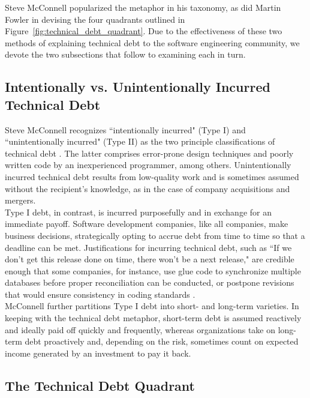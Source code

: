 Steve McConnell \cite{mcconnell} popularized the metaphor in his taxonomy, as did Martin Fowler \cite{fowler} in devising the four quadrants outlined in Figure~\ref{fig:technical_debt_quadrant}.  \revision Due to the effectiveness of these two methods of explaining technical debt to the software engineering community, we devote the two subsections that follow to examining each in turn.


\subsection{Intentionally vs. Unintentionally Incurred Technical Debt}

Steve McConnell recognizes ``intentionally incurred" (Type I) and ``unintentionally incurred" (Type II) as the two principle classifications of technical debt \cite{mcconnell}.  The latter comprises error-prone design techniques and poorly written code by an inexperienced programmer, among others.  Unintentionally incurred technical debt results from low-quality work and is sometimes assumed without the recipient's knowledge, as in the case of company acquisitions and mergers.\\
Type I debt, in contrast, is incurred purposefully and in exchange for an immediate payoff. Software development companies, like all companies, make business decisions, strategically opting to accrue debt from time to time so that a deadline can be met. Justifications for incurring technical debt, such as ``If we don't get this release done on time, there won't be a next release," are credible enough that some companies, for instance, use glue code to synchronize multiple databases before proper reconciliation can be conducted, or postpone revisions that would ensure consistency in coding standards \cite{mcconnell}.\\
McConnell further partitions Type I debt into short- and long-term varieties. In keeping with the technical debt metaphor, short-term debt is assumed reactively and ideally paid off quickly and frequently, whereas organizations take on long-term debt proactively and, depending on the risk, sometimes count on expected income generated by an investment to pay it back.



\subsection{The Technical Debt Quadrant}

